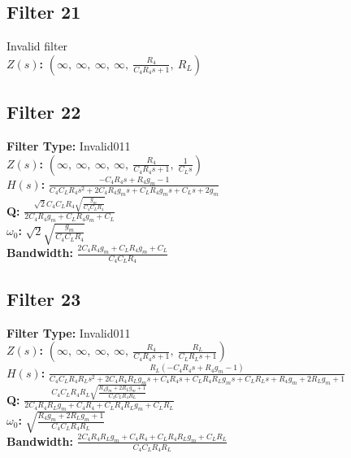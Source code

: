\documentclass{article}
\begin{document}
\subsection*{Filter 21}
Invalid filter \\ 
\textbf{$Z(s)$:} $\left( \infty, \  \infty, \  \infty, \  \infty, \  \frac{R_{4}}{C_{4} R_{4} s + 1}, \  R_{L}\right)$ \\ 
\subsection*{Filter 22}
\textbf{Filter Type:} Invalid011 \\ 
\textbf{$Z(s)$:} $\left( \infty, \  \infty, \  \infty, \  \infty, \  \frac{R_{4}}{C_{4} R_{4} s + 1}, \  \frac{1}{C_{L} s}\right)$ \\ 
\textbf{$H(s)$:} $\frac{- C_{4} R_{4} s + R_{4} g_{m} - 1}{C_{4} C_{L} R_{4} s^{2} + 2 C_{4} R_{4} g_{m} s + C_{L} R_{4} g_{m} s + C_{L} s + 2 g_{m}}$ \\ 
\textbf{Q:} $\frac{\sqrt{2} C_{4} C_{L} R_{4} \sqrt{\frac{g_{m}}{C_{4} C_{L} R_{4}}}}{2 C_{4} R_{4} g_{m} + C_{L} R_{4} g_{m} + C_{L}}$ \\ 
\textbf{$\omega_0$:} $\sqrt{2} \sqrt{\frac{g_{m}}{C_{4} C_{L} R_{4}}}$ \\ 
\textbf{Bandwidth:} $\frac{2 C_{4} R_{4} g_{m} + C_{L} R_{4} g_{m} + C_{L}}{C_{4} C_{L} R_{4}}$ \\ 
\subsection*{Filter 23}
\textbf{Filter Type:} Invalid011 \\ 
\textbf{$Z(s)$:} $\left( \infty, \  \infty, \  \infty, \  \infty, \  \frac{R_{4}}{C_{4} R_{4} s + 1}, \  \frac{R_{L}}{C_{L} R_{L} s + 1}\right)$ \\ 
\textbf{$H(s)$:} $\frac{R_{L} \left(- C_{4} R_{4} s + R_{4} g_{m} - 1\right)}{C_{4} C_{L} R_{4} R_{L} s^{2} + 2 C_{4} R_{4} R_{L} g_{m} s + C_{4} R_{4} s + C_{L} R_{4} R_{L} g_{m} s + C_{L} R_{L} s + R_{4} g_{m} + 2 R_{L} g_{m} + 1}$ \\ 
\textbf{Q:} $\frac{C_{4} C_{L} R_{4} R_{L} \sqrt{\frac{R_{4} g_{m} + 2 R_{L} g_{m} + 1}{C_{4} C_{L} R_{4} R_{L}}}}{2 C_{4} R_{4} R_{L} g_{m} + C_{4} R_{4} + C_{L} R_{4} R_{L} g_{m} + C_{L} R_{L}}$ \\ 
\textbf{$\omega_0$:} $\sqrt{\frac{R_{4} g_{m} + 2 R_{L} g_{m} + 1}{C_{4} C_{L} R_{4} R_{L}}}$ \\ 
\textbf{Bandwidth:} $\frac{2 C_{4} R_{4} R_{L} g_{m} + C_{4} R_{4} + C_{L} R_{4} R_{L} g_{m} + C_{L} R_{L}}{C_{4} C_{L} R_{4} R_{L}}$ \\ 
\end{document}
